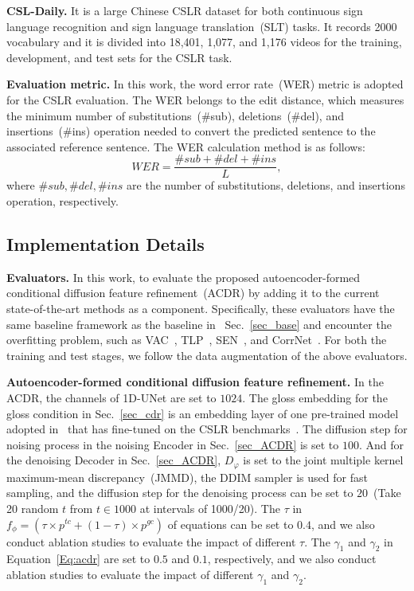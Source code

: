 \documentclass[sigconf]{acmart}
\begin{document}
\noindent\textbf{CSL-Daily\cite{zhou2021improving}.} It is a large Chinese CSLR dataset for both continuous sign language recognition and sign language translation~(SLT) tasks. 
It records 2000 vocabulary and it is divided into 18,401, 1,077, and 1,176 videos for the training, development, and  test sets for the CSLR task.

\noindent \textbf{Evaluation metric.} 
In this work, the word error rate~(WER) metric is adopted for the CSLR evaluation. The WER belongs to the edit distance, which measures the minimum number of substitutions~(\#sub), deletions~(\#del), and insertions~(\#ins) operation needed to convert the predicted sentence to the associated reference sentence. 
The WER calculation method is as follows:
\begin{equation}
WER = \frac{{{\#sub} + {\#del} + {\#ins}}}{L},
\end{equation}
\noindent where ${\#sub},{\#del},{\#ins}$ are the number of substitutions, deletions, and insertions operation, respectively. 


\subsection{Implementation Details}

\noindent \textbf{Evaluators.}
In this work, to evaluate the proposed autoencoder-formed conditional diffusion feature refinement~(ACDR) by adding it 
to the current state-of-the-art methods as a component.
Specifically, these evaluators have the same baseline framework as the baseline in ~Sec.~\ref{sec_base} and encounter the overfitting problem, such as VAC~\cite{min2021visual}, TLP~\cite{hu2022temporal}, SEN~\cite{Hu2022SelfEmphasizingNF}, and  CorrNet~\cite{hu2023continuous}.
For both the training and test stages, we follow the data augmentation of the above evaluators.


\noindent \textbf{Autoencoder-formed conditional diffusion feature refinement.}
In the ACDR, the channels of 1D-UNet are set to  $1024$.
The gloss embedding for the gloss condition in Sec.~\ref{sec_cdr} is an embedding layer of one pre-trained model adopted in~\cite{chen2022simple} that has fine-tuned
on the CSLR benchmarks~\cite{koller2015continuous,camgoz2018neural,zhou2021improving}.
The diffusion step for noising process in the noising Encoder in Sec.~\ref{sec_ACDR} is set to $100$.
And for the denoising Decoder in Sec.~\ref{sec_ACDR}, $D_\varphi$ is set to the joint multiple kernel maximum-mean discrepancy~(JMMD), the DDIM sampler is used for fast sampling, and the diffusion step for the denoising process can be set to $20$~(Take 20 random $t$ from $t \in 1000$ at intervals of 1000/20).
The $\tau$ in $f_\phi= (\tau  \times p^{tc}+(1-\tau) \times p^{gc})$ of equations can be set to $0.4$, and we also conduct ablation studies to evaluate the impact of different $\tau$.
The $\gamma_1$ and $\gamma_2$ in Equation~\ref{Eq:acdr} are set to $0.5$ and $0.1$, respectively, and we also conduct ablation studies to evaluate the impact of different $\gamma_1$ and $\gamma_2$.
\end{document}
